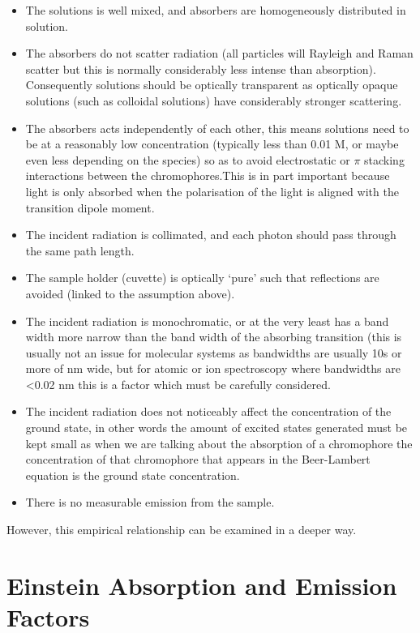 \documentclass[
]{book}
\providecommand{\tightlist}{%
  \setlength{\itemsep}{0pt}\setlength{\parskip}{0pt}}
\begin{document}
\begin{itemize}
\tightlist
\item
  The solutions is well mixed, and absorbers are homogeneously distributed in solution.
\item
  The absorbers do not scatter radiation (all particles will Rayleigh and Raman scatter but this is normally considerably less intense than absorption). Consequently solutions should be optically transparent as optically opaque solutions (such as colloidal solutions) have considerably stronger scattering.
\item
  The absorbers acts independently of each other, this means solutions need to be at a reasonably low concentration (typically less than 0.01 M, or maybe even less depending on the species) so as to avoid electrostatic or \(\pi\) stacking interactions between the chromophores.This is in part important because light is only absorbed when the polarisation of the light is aligned with the transition dipole moment.
\item
  The incident radiation is collimated, and each photon should pass through the same path length.
\item
  The sample holder (cuvette) is optically `pure' such that reflections are avoided (linked to the assumption above).
\item
  The incident radiation is monochromatic, or at the very least has a band width more narrow than the band width of the absorbing transition (this is usually not an issue for molecular systems as bandwidths are usually 10s or more of nm wide, but for atomic or ion spectroscopy where bandwidths are \textless0.02 nm this is a factor which must be carefully considered.
\item
  The incident radiation does not noticeably affect the concentration of the ground state, in other words the amount of excited states generated must be kept small as when we are talking about the absorption of a chromophore the concentration of that chromophore that appears in the Beer-Lambert equation is the ground state concentration.
\item
  There is no measurable emission from the sample.
\end{itemize}

However, this empirical relationship can be examined in a deeper way.

\hypertarget{sec:Einstein}{%
\section{Einstein Absorption and Emission Factors}\label{sec:Einstein}}
\end{document}
